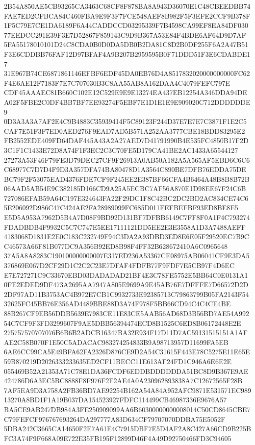 \documentclass[UTF8,fontset=fandol,zihao=-4,a4paper]{ctexart}
\begin{document}
{{2B54A850AE5CB93265CA3463C68CF8F878BA8A943D36070E1C48CBEEDBB74FAE7ED2CFBCA84C460FBA9E9F3F7FCE548AEF8B982F5F3EFE2CCF9B378F
1F5C79E7CE1DA6189F6A44CADDCCD03295339F7B4598CA99EF8EA84DF03077EEDCC291E39F3E7D52867F859143C9D9B367A53E84F4BDE6AF64D9D7AF
5FA55178010101D24C8CDA0B0D0DA5DB0B2DA81C8D2B0DF255F6A2A47B51F3E6CDDBB76FAF12D97BFAF4A9B207B2959595B0F71DDD51F3E6CDABDE17
31E967B74CE6871861146EFBF6EDF45DA0EB76D4A8517832020000000000FC62F4E6AE12F7183F7E7C707030B3C8AA55AB8A162DAA4C4079FEFC797E
CDF45AAAEC81B660C102E12C529E9E9E13274EA437EB12254A346DDA94DEA02F5FBE2C0DF4BB7BF7EE93274F5EBF7E1D1E1E9E909020C712DDDDDDE9
0D3A3A3A7AF2E4C9B4883C35939414F5C89123F244D37E7E7E7C3871F1E2C5CAF7E51F3F7ED0AED276F9EAD7AD5B571A252AA3777CBE18BDD83295E2
FB2552EDE409FD64DAF445A43A2A27AED7D41791990B4E535FC4850B17F2D3C1F1C1433E72D8A74F1F3EC2C3C70FE5D179CA41BE2AC1433A65544127
27273A53F46F79FE3D79DEC27CF9F26913A0AB50A182A5A565AF5EBD6C6C6C68977C7D7D4F9D3A357DFA74BA80478D1A3564C890BE7DFB76EDDA75DE
BC79F2F53075EAD4376FDE7CF9F245EE2E387BF66CFA4B6464A48B8B8B72B06AAD5AB54E9C382185D166CD9A25A5ECBC7AF56A870E1D98EE67F24C6B
727086EFAB59A64C197E324643FA22F29DC1F8C42BC2DC2BD2AC834CE74C65E206092D986C47C424AE2FA28989099FC685D011FEFBEFBF93ED8BE8E5
E5D5A953A7962D5B4A7D08F9BD92D131BF7DFBB6149C7FF8F0A1F4C793274FDADBDB4F9932C5C7C747E5EE17111121DD5EE2E3E3558A1D3A7488AEFF
4183068D1831E2E0C183C232749F94C3DA2A93DBD3ED8E6E05F29520EC7B9CC46573A66F81B077DC9A356B92ED8B98F4FF32B628672410A6C0965648
37A5A8A8283C190100000000007E317ED236A53367CE08975AB06041CF9E3DA5376869E067D2CF29D1C2C2C23E7DFAF4FDFB77F9FDF7E5CB97F4D6EC
E7E727271C9C33670EBD03DADADAD21BF4E3C78FE5752E5BB64C0E0131A10FE2EDED9DF473A2695AA7947A805E9699A9E45AB76E7DFFFE7D66572D2D
2DF97AD11B3753AC4B972E7CB1C9932733E92385713C79863799B05FA2143F5432625FC45BB76E356AD4489BBE88D3A74F978F5BB66CD94C4C4CE4BE
88B267CF9EB56DDB5639E7983CE11E83CE5AAB56AD68D3B56BD7AE54A99254C7CF9F3FD3299607F9AE5DBB56394474ECD8B1525C6ED8B06172448E2E
275757570707076B6B6B2ADCB16347BA32E934F17D11D7AC59131515151A1AFAE2C58B070F1E50C5ADACAC983274254833B9A98713957D11699FA5EB
6AE6CC99CA5E49BFA62FA2326D876CE9D2A54C31615F443E78C5275E11E65E59B870219D2026333233635ED2CF11BECC11E613AF24FD1C946A6E6E2E
055469B52A21353A71C78E1DA36FCDF6EDDBDDDDDDA51BC8D9B367E9AE424786D6A3EC5BC8888F8F976F2F2AE4A0A230962893838A7C12672565F28B
7AF5EA9D3A758A2FB36BD7AE92254B162A54A84A952AFC9871E531571EC98913270A8BD1F1A19B037DA154523927FDFC114499CB46987336E9676A57
BA5CE9AB247DB984A3FE250909099AA6B60300000000008014C50CD8645CBE7C79FEFCF976767693264DA297777A83D634CF79707070DDBA75E5052F
5DBA242C3665CA14650F2E7A61E4C7915DBF7E5D4AF2A8C427A66CD9B225BFC3A74F9F668A09E722E35FB195F12899D46F4A49D92750466FD3C94605
}}
\end{document}
